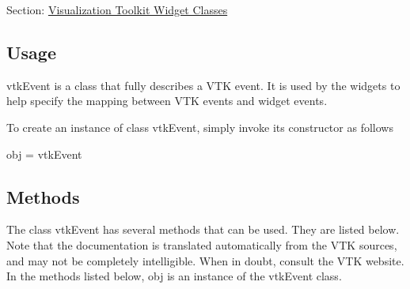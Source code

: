 Section\-: \hyperlink{sec_vtkwidgets}{Visualization Toolkit Widget Classes} \hypertarget{vtkwidgets_vtkxyplotwidget_Usage}{}\subsection{Usage}\label{vtkwidgets_vtkxyplotwidget_Usage}
vtk\-Event is a class that fully describes a V\-T\-K event. It is used by the widgets to help specify the mapping between V\-T\-K events and widget events.

To create an instance of class vtk\-Event, simply invoke its constructor as follows \begin{DoxyVerb}  obj = vtkEvent
\end{DoxyVerb}
 \hypertarget{vtkwidgets_vtkxyplotwidget_Methods}{}\subsection{Methods}\label{vtkwidgets_vtkxyplotwidget_Methods}
The class vtk\-Event has several methods that can be used. They are listed below. Note that the documentation is translated automatically from the V\-T\-K sources, and may not be completely intelligible. When in doubt, consult the V\-T\-K website. In the methods listed below, {\ttfamily obj} is an instance of the vtk\-Event class. 
